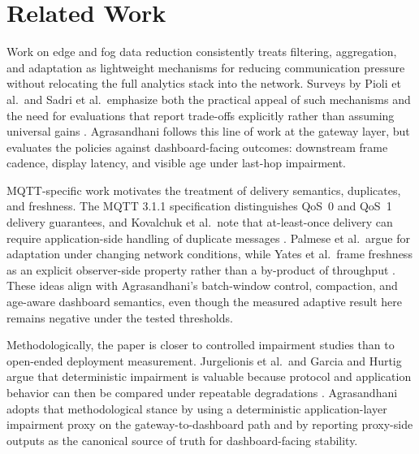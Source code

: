 \section{Related Work}

Work on edge and fog data reduction consistently treats filtering, aggregation, and adaptation as lightweight mechanisms for reducing communication pressure without relocating the full analytics stack into the network. Surveys by Pioli et al.\ and Sadri et al.\ emphasize both the practical appeal of such mechanisms and the need for evaluations that report trade-offs explicitly rather than assuming universal gains \cite{pioli2022_edge_data_reduction_mapping,sadri2022_fog_data_reduction_survey}. Agrasandhani follows this line of work at the gateway layer, but evaluates the policies against dashboard-facing outcomes: downstream frame cadence, display latency, and visible age under last-hop impairment.

MQTT-specific work motivates the treatment of delivery semantics, duplicates, and freshness. The MQTT 3.1.1 specification distinguishes QoS~0 and QoS~1 delivery guarantees, and Kovalchuk et al.\ note that at-least-once delivery can require application-side handling of duplicate messages \cite{mqtt311,kovalchuk2018_mqtt_architecture_delay}. Palmese et al.\ argue for adaptation under changing network conditions, while Yates et al.\ frame freshness as an explicit observer-side property rather than a by-product of throughput \cite{palmese2022_adaptive_qos_mqttsn,yates2021_age_of_information_survey}. These ideas align with Agrasandhani's batch-window control, compaction, and age-aware dashboard semantics, even though the measured adaptive result here remains negative under the tested thresholds.

Methodologically, the paper is closer to controlled impairment studies than to open-ended deployment measurement. Jurgelionis et al.\ and Garcia and Hurtig argue that deterministic impairment is valuable because protocol and application behavior can then be compared under repeatable degradations \cite{jurgelionis2011_netem_empirical,garcia2016_kaunetem_netdev}. Agrasandhani adopts that methodological stance by using a deterministic application-layer impairment proxy on the gateway-to-dashboard path and by reporting proxy-side outputs as the canonical source of truth for dashboard-facing stability.
